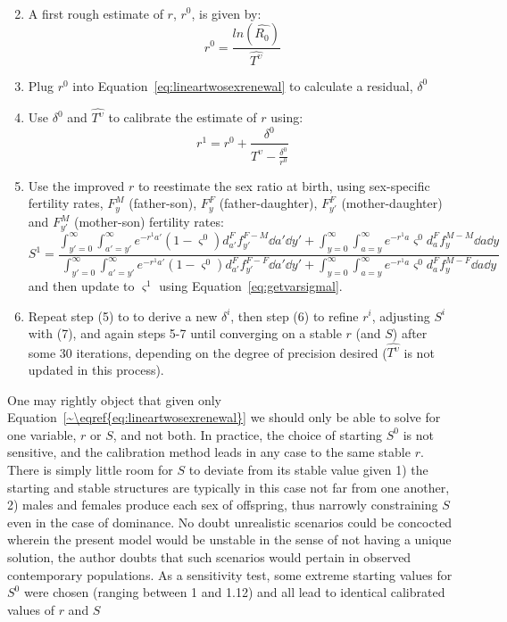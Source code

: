 \begin{enumerate}
\begin{equation}
\begin{split}
 \end{split}
 \end{equation}
  \item A first rough estimate of $r$, $r^0$, is given by:
   \begin{equation}
   r^0 = \frac{ln(\widehat{R_0})}{\widehat{T^\upsilon}}
   \end{equation}
  \item Plug $r^0$ into Equation~\eqref{eq:lineartwosexrenewal} to calculate a
  residual, $\delta^0$
  \item Use $\delta^0$ and $\widehat{T^\upsilon}$ to calibrate the estimate of $r$
  using:
  \begin{equation}
  r^{1} = r^0 + \frac{\delta^0}{\widehat{T^\upsilon} - \frac{\delta^0}{r^0}}
  \end{equation}
  \item  Use the improved $r$ to reestimate the sex ratio at birth, using
  sex-specific fertility rates, $F_y^M$ (father-son), $F_y^F$
  (father-daughter), $F_{y'}^F$ (mother-daughter) and $F_{y'}^M$ (mother-son)
  fertility rates:
  \begin{equation}
  S^1 = \frac{ \int _{y'=0}^\infty \int _{a'=y'}^\infty e^{-r^1a'}
                      (1-\varsigma^0)d_{a'}^F f_{y'}^{F-M} \dd a' \dd y' + \int
                      _{y=0}^\infty \int _{a=y}^\infty e^{-r^1a}
                      \varsigma^0 d_{a}^F f_{y}^{M-M} \dd a \dd y}{\int
                      _{y'=0}^\infty \int _{a'=y'}^\infty e^{-r^1a'}
                      (1-\varsigma^0)d_{a'}^F f_{y'}^{F-F} \dd a' \dd y' + \int
                      _{y=0}^\infty \int _{a=y}^\infty e^{-r^1a} \varsigma^0
                      d_{a}^F f_{y}^{M-F} \dd a \dd y}
  \end{equation}
  and then update to $\varsigma^1$ using Equation~\eqref{eq:getvarsigmal}.
  \item Repeat step (5) to to derive a new $\delta^i$, then step (6) to refine
  $r^i$, adjusting $S^i$ with (7), and again steps 5-7 until converging on a
  stable $r$ (and $S$) after some 30 iterations, depending on the degree of
  precision desired ($\widehat{T^\upsilon}$ is not updated in this process).
\end{enumerate}
  One may rightly object that given only
  Equation~\eqref{~\eqref{eq:lineartwosexrenewal}} we should only be able to
  solve for one variable, $r$ or $S$, and not both. In practice, the choice of
  starting $S^0$ is not sensitive, and the calibration method leads in any case
  to the same stable $r$. There is simply little room for $S$ to deviate from its
  stable value given 1) the starting and stable structures are typically in this
  case not far from one another, 2) males and females produce each sex of
  offspring, thus narrowly constraining $S$ even in the case of dominance. No
  doubt unrealistic scenarios could be concocted wherein the present model would be
  unstable in the sense of not having a unique solution, the author doubts that
  such scenarios would pertain in observed contemporary populations. As a
  sensitivity test, some extreme starting values for $S^0$ were chosen (ranging
  between 1 and 1.12) and all lead to identical calibrated values of $r$ and $S$
